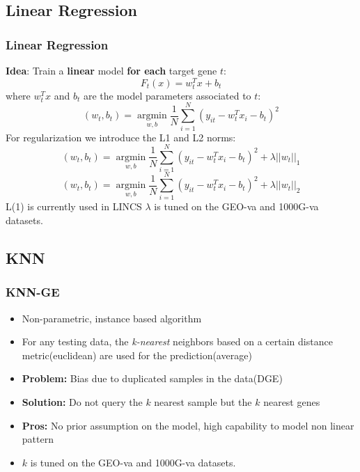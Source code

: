 \documentclass[professionalfont]{beamer}
\DeclareMathOperator*{\argmin}{argmin}
\begin{document}
  \subsection{Linear Regression}
	\begin{frame}
	  \frametitle{Linear Regression}
    \textbf{Idea}: Train a \textbf{linear} model \textbf{for each} target gene $t$:
    \begin{equation*}
      F_t(x) = w_{t}^T x + b_t
    \end{equation*}
    where $w_{t}^T x$ and $b_t$ are the model parameters associated to $t$:
    \begin{equation}
      (w_t, b_t) = \argmin \limits_{w,b} \frac{1}{N} \sum_{i=1}^N (y_{it} - w_t^T x_i - b_t)^2
    \end{equation}
    For regularization we introduce the L1 and L2 norms:
    \begin{equation}
      (w_t, b_t) = \argmin \limits_{w,b} \frac{1}{N} \sum_{i=1}^N (y_{it} - w_t^T x_i - b_t)^2 + \lambda ||w_t||_1
    \end{equation}
    \begin{equation}
      (w_t, b_t) = \argmin \limits_{w,b} \frac{1}{N} \sum_{i=1}^N (y_{it} - w_t^T x_i - b_t)^2 + \lambda ||w_t||_2
    \end{equation}
    L(1) is currently used in LINCS\newline
    $\lambda$ is tuned on the GEO-va and 1000G-va datasets.
	\end{frame}

  \subsection{KNN}
	\begin{frame}
	  \frametitle{KNN-GE}
    \begin{itemize}
      \item Non-parametric, instance based algorithm
      \item For any testing data, the \textit{k-nearest} neighbors based on a certain
      distance metric(euclidean) are used for the prediction(average)
      \item \textbf{Problem: } Bias due to duplicated samples in the data(DGE)
      \item \textbf{Solution: } Do not query the $k$ nearest sample but the $k$
      nearest genes
      \item \textbf{Pros: } No prior assumption on the model, high capability to
      model non linear pattern
      \item $k$ is tuned on the GEO-va and 1000G-va datasets.
    \end{itemize}
	\end{frame}
\end{document}
